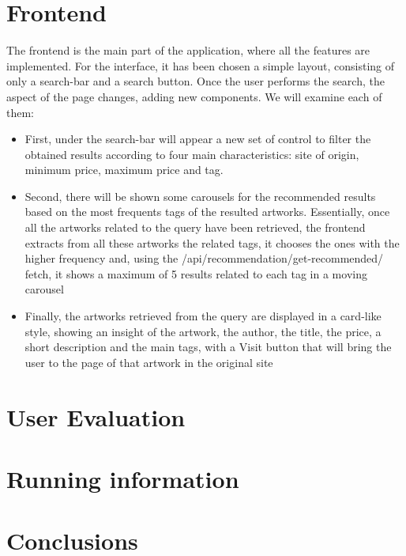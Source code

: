 \documentclass[12pt]{spieman}  %
\begin{document}
\begin{spacing}{1}
    \section{Frontend}
    The frontend is the main part of the application, where all the features are implemented.\newline
    For the interface, it has been chosen a simple layout, consisting of only a search-bar and a search button. Once the user performs the search, the aspect of the page changes, adding new components. We will examine each of them:
    \begin{itemize}
        \item First, under the search-bar will appear a new set of control to filter the obtained results according to four main characteristics: site of origin, minimum price, maximum price and tag.
        \item Second, there will be shown some carousels for the recommended results based on the most frequents tags of the resulted artworks. Essentially, once all the artworks related to the query have been retrieved, the frontend extracts from all these artworks the related tags, it chooses the ones with the higher frequency and, using the /api/recommendation/get-recommended/ fetch, it shows a maximum of 5 results related to each tag in a moving carousel
        \item Finally, the artworks retrieved from the query are displayed in a card-like style, showing an insight of the artwork, the author, the title, the price, a short description and the main tags, with a Visit button that will bring the user to the page of that artwork in the original site
    \end{itemize}
    \section{User Evaluation}

    \section{Running information}

    \section{Conclusions}
\end{spacing}
\end{document}
